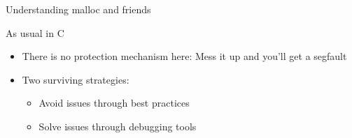 \begin{frame}{Understanding malloc and friends}
  \begin{block}{As usual in C}
    \begin{itemize}
    \item There is no protection mechanism here: Mess it up and you'll get a segfault
    \item Two surviving strategies:
      \begin{itemize}
      \item Avoid issues through best practices
      \item Solve issues through debugging tools
      \end{itemize}
    \end{itemize}
  \end{block}
\end{frame}
